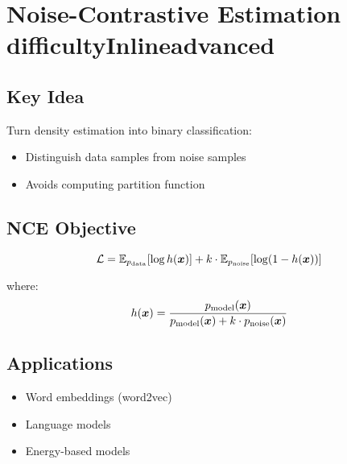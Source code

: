 
\section{Noise-Contrastive Estimation \\difficultyInline{advanced}}
\label{sec:nce}


\subsection{Key Idea}

Turn density estimation into binary classification:
\begin{itemize}
    \item Distinguish data samples from noise samples
    \item Avoids computing partition function
\end{itemize}

\subsection{NCE Objective}

\begin{equation}
\mathcal{L} = \mathbb{E}_{p_{\text{data}}}[\log h(\boldsymbol{x})] + k \cdot \mathbb{E}_{p_{\text{noise}}}[\log(1-h(\boldsymbol{x}))]
\end{equation}

where:
\begin{equation}
h(\boldsymbol{x}) = \frac{p_{\text{model}}(\boldsymbol{x})}{p_{\text{model}}(\boldsymbol{x}) + k \cdot p_{\text{noise}}(\boldsymbol{x})}
\end{equation}

\subsection{Applications}

\begin{itemize}
    \item Word embeddings (word2vec)
    \item Language models
    \item Energy-based models
\end{itemize}



